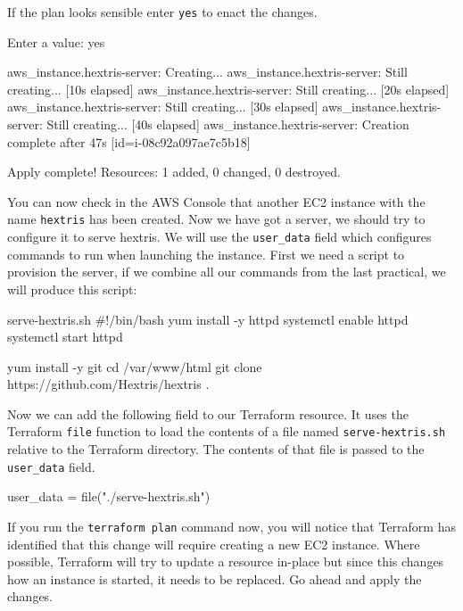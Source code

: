 \documentclass{csse4400}
\begin{document}
If the plan looks sensible enter \texttt{yes} to enact the changes.

\begin{code}[numbers=none]{}
  Enter a value: yes

aws_instance.hextris-server: Creating...
aws_instance.hextris-server: Still creating... [10s elapsed]
aws_instance.hextris-server: Still creating... [20s elapsed]
aws_instance.hextris-server: Still creating... [30s elapsed]
aws_instance.hextris-server: Still creating... [40s elapsed]
aws_instance.hextris-server: Creation complete after 47s [id=i-08c92a097ae7c5b18]

Apply complete! Resources: 1 added, 0 changed, 0 destroyed.
\end{code}

You can now check in the AWS Console that another EC2 instance with the name \texttt{hextris} has been created.
Now we have got a server, we should try to configure it to serve hextris.
We will use the \texttt{user\_data} field which configures commands to run when launching the instance.
First we need a script to provision the server, if we combine all our commands from the last practical, we will produce this script:

\begin{code}[language=bash,numbers=none]{serve-hextris.sh}
#!/bin/bash
yum install -y httpd
systemctl enable httpd
systemctl start httpd

yum install -y git
cd /var/www/html
git clone https://github.com/Hextris/hextris .  
\end{code}



Now we can add the following field to our Terraform resource.
It uses the Terraform \texttt{file} function to load the contents of a file named \texttt{serve-hextris.sh} relative to the Terraform directory.
The contents of that file is passed to the \texttt{user\_data} field.

\begin{code}[language=terraform,numbers=none]{}
user_data = file("./serve-hextris.sh")
\end{code}

If you run the \texttt{terraform plan} command now,
you will notice that Terraform has identified that this change will require creating a new EC2 instance.
Where possible, Terraform will try to update a resource in-place but since this changes how an instance is started, it needs to be replaced.
Go ahead and apply the changes.
\end{document}
